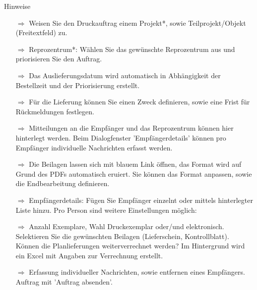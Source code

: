 \documentclass{article}
\begin{document}
\begin{beamerlikethm}{Hinweise}
\begin{itemize}
  \item[$\Longrightarrow$] Weisen Sie den Druckauftrag einem Projekt*, sowie Teilprojekt/Objekt (Freitextfeld) zu.
  \item[$\Longrightarrow$] Reprozentrum*: Wählen Sie das gewünschte Reprozentrum aus und priorisieren Sie den Auftrag.
  \item[$\Longrightarrow$] Das Auslieferungsdatum wird automatisch in Abhängigkeit der Bestellzeit und der Priorisierung erstellt.
  \item[$\Longrightarrow$] Für die Lieferung können Sie einen Zweck definieren, sowie eine Frist für Rückmeldungen festlegen.
  \item[$\Longrightarrow$] Mitteilungen an die Empfänger und das Reprozentrum können hier hinterlegt werden. Beim Dialogfenster 'Empfängerdetails' können pro Empfänger individuelle Nachrichten erfasst werden.
	\item[$\Longrightarrow$] Die Beilagen lassen sich mit blauem Link öffnen, das Format wird auf Grund des PDFs automatisch eruiert. Sie können das Format anpassen, sowie die Endbearbeitung definieren.
	\item[$\Longrightarrow$] Empfängerdetails: Fügen Sie Empfänger einzelnt oder mittels hinterlegter Liste hinzu. Pro Person sind weitere Einstellungen möglich:
	\item[$\Longrightarrow$] Anzahl Exemplare, Wahl Druckexemplar oder/und elektronisch. Selektieren Sie die gewünschten Beilagen (Lieferschein, Kontrollblatt). Können die Planlieferungen weiterverrechnet werden? Im Hintergrund wird ein Excel mit Angaben zur Verrechnung erstellt.
	\item[$\Longrightarrow$] Erfassung individueller Nachrichten, sowie entfernen eines Empfängers. Auftrag mit 'Auftrag absenden'.
\end{itemize}
\end{beamerlikethm}


\end{document}
